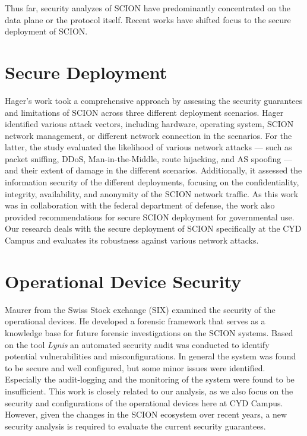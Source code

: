 Thus far, security analyzes of SCION have predominantly concentrated on the data plane or the protocol itself.
Recent works have shifted focus to the secure deployment of SCION.

\section{Secure Deployment}
Hager's work \cite{Hager2024} took a comprehensive approach by assessing the security guarantees and limitations of SCION across three different deployment scenarios.
Hager identified various attack vectors, including hardware, operating system, SCION network management, or different network connection in the scenarios.
For the latter, the study evaluated the likelihood of various network attacks --- such as packet sniffing, DDoS, Man-in-the-Middle, route hijacking, and AS spoofing --- and their extent of damage in the different scenarios.
Additionally, it assessed the information security of the different deployments, focusing on the confidentiality, integrity, availability, and anonymity of the SCION network traffic.
As this work was in collaboration with the federal department of defense, the work also provided recommendations for secure SCION deployment for governmental use.
Our research deals with the secure deployment of SCION specifically at the CYD Campus and evaluates its robustness against various network attacks.


\section{Operational Device Security}
\label{sec:operational-device-security}
Maurer \cite{Maurer2021} from the Swiss Stock exchange (SIX) examined the security of the operational devices.
He developed a forensic framework that serves as a knowledge base for future forensic investigations on the SCION systems.
Based on the tool \textit{Lynis} an automated security audit was conducted to identify potential vulnerabilities and misconfigurations.
In general the system was found to be secure and well configured, but some minor issues were identified.
Especially the audit-logging and the monitoring of the system were found to be insufficient.
This work is closely related to our analysis, as we also focus on the security and configurations of the operational devices here at CYD Campus.
However, given the changes in the SCION ecosystem over recent years, a new security analysis is required to evaluate the current security guarantees.

